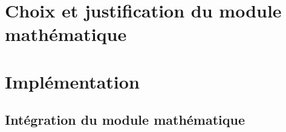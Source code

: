 \documentclass[10pt]{report}
\begin{document}
	\section{Choix et justification du module mathématique}

	
	\section{Implémentation}
	\subsection{Intégration du module mathématique} 
	
\end{document}
